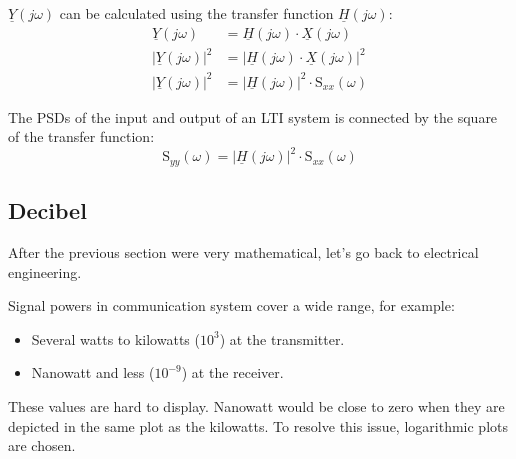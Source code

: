 \begin{refsection}
$\underline{Y}\left(j \omega\right)$ can be calculated using the transfer function $\underline{H}\left(j \omega\right)$:
\begin{equation}
	\begin{split}
		\underline{Y}\left(j \omega\right) &= \underline{H}\left(j \omega\right) \cdot \underline{X}\left(j \omega\right) \\
		\left|\underline{Y}\left(j \omega\right)\right|^2 &= \left|\underline{H}\left(j \omega\right) \cdot \underline{X}\left(j \omega\right)\right|^2 \\
		\left|\underline{Y}\left(j \omega\right)\right|^2 &= \left|\underline{H}\left(j \omega\right)\right|^2 \cdot \mathrm{S}_{xx}(\omega)
	\end{split}
\end{equation}

The \acp{PSD} of the input and output of an \acs{LTI} system is connected by the square of the transfer function:
\begin{equation}
	\mathrm{S}_{yy}(\omega) = \left|\underline{H}\left(j \omega\right)\right|^2 \cdot \mathrm{S}_{xx}(\omega)
	\label{eq:ch03:psd_lti_io}
\end{equation}

\subsection{Decibel}

After the previous section were very mathematical, let's go back to electrical engineering.

Signal powers in communication system cover a wide range, for example:
\begin{itemize}
	\item Several watts to kilowatts ($10^3$) at the transmitter.
	\item Nanowatt and less ($10^{-9}$) at the receiver.
\end{itemize}
These values are hard to display. Nanowatt would be close to zero when they are depicted in the same plot as the kilowatts. To resolve this issue, logarithmic plots are chosen.

\begin{figure}[H]
	\centering
	

\end{figure}
\end{refsection}
